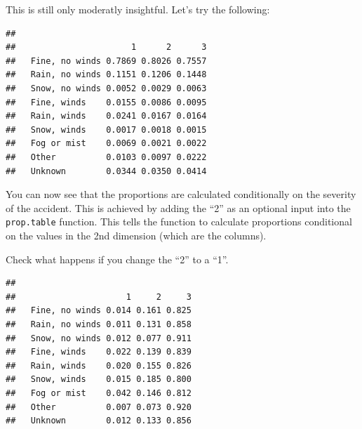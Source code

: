\documentclass[
]{article}
\newenvironment{Shaded}{\begin{snugshade}}{\end{snugshade}}
\newcommand{\DecValTok}[1]{\textcolor[rgb]{0.00,0.00,0.81}{#1}}
\newcommand{\FunctionTok}[1]{\textcolor[rgb]{0.13,0.29,0.53}{\textbf{#1}}}
\newcommand{\NormalTok}[1]{#1}
\newcommand{\SpecialCharTok}[1]{\textcolor[rgb]{0.81,0.36,0.00}{\textbf{#1}}}
\begin{document}
This is still only moderatly insightful. Let's try the following:

\begin{Shaded}
\end{Shaded}

\begin{verbatim}
##                 
##                       1      2      3
##   Fine, no winds 0.7869 0.8026 0.7557
##   Rain, no winds 0.1151 0.1206 0.1448
##   Snow, no winds 0.0052 0.0029 0.0063
##   Fine, winds    0.0155 0.0086 0.0095
##   Rain, winds    0.0241 0.0167 0.0164
##   Snow, winds    0.0017 0.0018 0.0015
##   Fog or mist    0.0069 0.0021 0.0022
##   Other          0.0103 0.0097 0.0222
##   Unknown        0.0344 0.0350 0.0414
\end{verbatim}

You can now see that the proportions are calculated conditionally on the
severity of the accident. This is achieved by adding the ``2'' as an
optional input into the \texttt{prop.table} function. This tells the
function to calculate proportions conditional on the values in the 2nd
dimension (which are the columns).

Check what happens if you change the ``2'' to a ``1''.

\begin{Shaded}
\end{Shaded}

\begin{verbatim}
##                 
##                      1     2     3
##   Fine, no winds 0.014 0.161 0.825
##   Rain, no winds 0.011 0.131 0.858
##   Snow, no winds 0.012 0.077 0.911
##   Fine, winds    0.022 0.139 0.839
##   Rain, winds    0.020 0.155 0.826
##   Snow, winds    0.015 0.185 0.800
##   Fog or mist    0.042 0.146 0.812
##   Other          0.007 0.073 0.920
##   Unknown        0.012 0.133 0.856
\end{verbatim}
\end{document}

